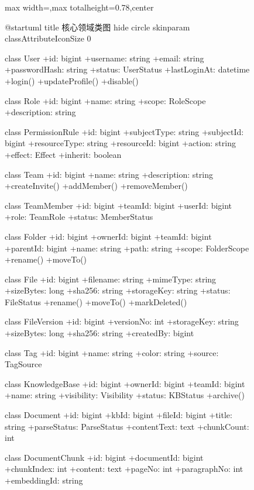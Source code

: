 \documentclass[a4paper,zihao=-4]{ctexart}
\begin{document}
\begin{figure}[H]
\centering
\begin{adjustbox}{max width=\linewidth,max totalheight=0.78\textheight,center}
\begingroup
\renewcommand{\PlantUMLJobname}{plantuml-diagrams/req-uml-10}
\begin{plantuml}
@startuml
title 核心领域类图
hide circle
skinparam classAttributeIconSize 0

class User {
  +id: bigint
  +username: string
  +email: string
  +passwordHash: string
  +status: UserStatus
  +lastLoginAt: datetime
  +login()
  +updateProfile()
  +disable()
}

class Role {
  +id: bigint
  +name: string
  +scope: RoleScope
  +description: string
}

class PermissionRule {
  +id: bigint
  +subjectType: string
  +subjectId: bigint
  +resourceType: string
  +resourceId: bigint
  +action: string
  +effect: Effect
  +inherit: boolean
}

class Team {
  +id: bigint
  +name: string
  +description: string
  +createInvite()
  +addMember()
  +removeMember()
}

class TeamMember {
  +id: bigint
  +teamId: bigint
  +userId: bigint
  +role: TeamRole
  +status: MemberStatus
}

class Folder {
  +id: bigint
  +ownerId: bigint
  +teamId: bigint
  +parentId: bigint
  +name: string
  +path: string
  +scope: FolderScope
  +rename()
  +moveTo()
}

class File {
  +id: bigint
  +filename: string
  +mimeType: string
  +sizeBytes: long
  +sha256: string
  +storageKey: string
  +status: FileStatus
  +rename()
  +moveTo()
  +markDeleted()
}

class FileVersion {
  +id: bigint
  +versionNo: int
  +storageKey: string
  +sizeBytes: long
  +sha256: string
  +createdBy: bigint
}

class Tag {
  +id: bigint
  +name: string
  +color: string
  +source: TagSource
}

class KnowledgeBase {
  +id: bigint
  +ownerId: bigint
  +teamId: bigint
  +name: string
  +visibility: Visibility
  +status: KBStatus
  +archive()
}

class Document {
  +id: bigint
  +kbId: bigint
  +fileId: bigint
  +title: string
  +parseStatus: ParseStatus
  +contentText: text
  +chunkCount: int
}

class DocumentChunk {
  +id: bigint
  +documentId: bigint
  +chunkIndex: int
  +content: text
  +pageNo: int
  +paragraphNo: int
  +embeddingId: string
}


\end{plantuml}
\end{adjustbox}
\end{figure}
\end{document}
